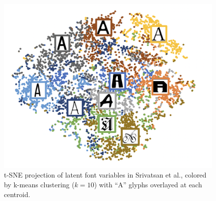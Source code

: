 \begin{figure}[h]
    \centering
    \includegraphics[width=.7\textwidth]{images/srivatsan-latent.png}
    \caption{t-SNE projection of latent font variables in Srivatsan et al., colored by k-means clustering ($k=10$) with ``A'' glyphs overlayed at each centroid.}
    \label{fig:srivatsan-latent}
\end{figure}
